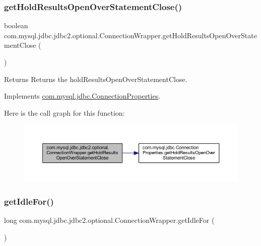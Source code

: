 \subsubsection{\texorpdfstring{get\+Hold\+Results\+Open\+Over\+Statement\+Close()}{getHoldResultsOpenOverStatementClose()}}
{\footnotesize\ttfamily boolean com.\+mysql.\+jdbc.\+jdbc2.\+optional.\+Connection\+Wrapper.\+get\+Hold\+Results\+Open\+Over\+Statement\+Close (\begin{DoxyParamCaption}{ }\end{DoxyParamCaption})}

\begin{DoxyReturn}{Returns}
Returns the hold\+Results\+Open\+Over\+Statement\+Close. 
\end{DoxyReturn}


Implements \mbox{\hyperlink{interfacecom_1_1mysql_1_1jdbc_1_1_connection_properties_a33f1647a0e97bcb10d880500fc9e8cf0}{com.\+mysql.\+jdbc.\+Connection\+Properties}}.

Here is the call graph for this function\+:
\nopagebreak
\begin{figure}[H]
\begin{center}
\leavevmode
\includegraphics[width=350pt]{classcom_1_1mysql_1_1jdbc_1_1jdbc2_1_1optional_1_1_connection_wrapper_a9c65556621e7f08517f84c8114f92d39_cgraph}
\end{center}
\end{figure}
\mbox{\label{classcom_1_1mysql_1_1jdbc_1_1jdbc2_1_1optional_1_1_connection_wrapper_a5fe7514c30944bba398ec0412e78bd90}} 
\subsubsection{\texorpdfstring{get\+Idle\+For()}{getIdleFor()}}
{\footnotesize\ttfamily long com.\+mysql.\+jdbc.\+jdbc2.\+optional.\+Connection\+Wrapper.\+get\+Idle\+For (\begin{DoxyParamCaption}{ }\end{DoxyParamCaption})}

